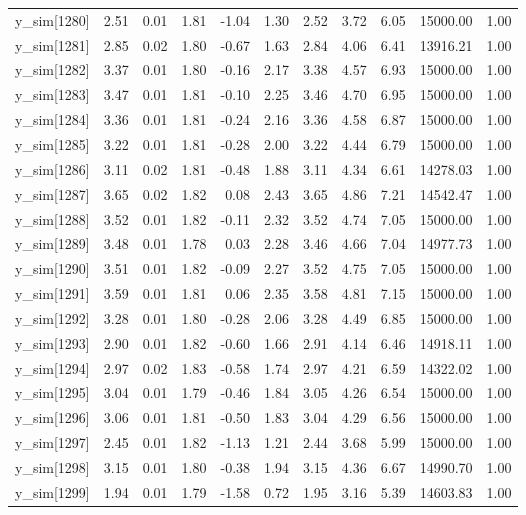 \begin{table}[ht]
\begin{tabular}{rrrrrrrrrrr}
  y\_sim[1280] & 2.51 & 0.01 & 1.81 & -1.04 & 1.30 & 2.52 & 3.72 & 6.05 & 15000.00 & 1.00 \\ 
  y\_sim[1281] & 2.85 & 0.02 & 1.80 & -0.67 & 1.63 & 2.84 & 4.06 & 6.41 & 13916.21 & 1.00 \\ 
  y\_sim[1282] & 3.37 & 0.01 & 1.80 & -0.16 & 2.17 & 3.38 & 4.57 & 6.93 & 15000.00 & 1.00 \\ 
  y\_sim[1283] & 3.47 & 0.01 & 1.81 & -0.10 & 2.25 & 3.46 & 4.70 & 6.95 & 15000.00 & 1.00 \\ 
  y\_sim[1284] & 3.36 & 0.01 & 1.81 & -0.24 & 2.16 & 3.36 & 4.58 & 6.87 & 15000.00 & 1.00 \\ 
  y\_sim[1285] & 3.22 & 0.01 & 1.81 & -0.28 & 2.00 & 3.22 & 4.44 & 6.79 & 15000.00 & 1.00 \\ 
  y\_sim[1286] & 3.11 & 0.02 & 1.81 & -0.48 & 1.88 & 3.11 & 4.34 & 6.61 & 14278.03 & 1.00 \\ 
  y\_sim[1287] & 3.65 & 0.02 & 1.82 & 0.08 & 2.43 & 3.65 & 4.86 & 7.21 & 14542.47 & 1.00 \\ 
  y\_sim[1288] & 3.52 & 0.01 & 1.82 & -0.11 & 2.32 & 3.52 & 4.74 & 7.05 & 15000.00 & 1.00 \\ 
  y\_sim[1289] & 3.48 & 0.01 & 1.78 & 0.03 & 2.28 & 3.46 & 4.66 & 7.04 & 14977.73 & 1.00 \\ 
  y\_sim[1290] & 3.51 & 0.01 & 1.82 & -0.09 & 2.27 & 3.52 & 4.75 & 7.05 & 15000.00 & 1.00 \\ 
  y\_sim[1291] & 3.59 & 0.01 & 1.81 & 0.06 & 2.35 & 3.58 & 4.81 & 7.15 & 15000.00 & 1.00 \\ 
  y\_sim[1292] & 3.28 & 0.01 & 1.80 & -0.28 & 2.06 & 3.28 & 4.49 & 6.85 & 15000.00 & 1.00 \\ 
  y\_sim[1293] & 2.90 & 0.01 & 1.82 & -0.60 & 1.66 & 2.91 & 4.14 & 6.46 & 14918.11 & 1.00 \\ 
  y\_sim[1294] & 2.97 & 0.02 & 1.83 & -0.58 & 1.74 & 2.97 & 4.21 & 6.59 & 14322.02 & 1.00 \\ 
  y\_sim[1295] & 3.04 & 0.01 & 1.79 & -0.46 & 1.84 & 3.05 & 4.26 & 6.54 & 15000.00 & 1.00 \\ 
  y\_sim[1296] & 3.06 & 0.01 & 1.81 & -0.50 & 1.83 & 3.04 & 4.29 & 6.56 & 15000.00 & 1.00 \\ 
  y\_sim[1297] & 2.45 & 0.01 & 1.82 & -1.13 & 1.21 & 2.44 & 3.68 & 5.99 & 15000.00 & 1.00 \\ 
  y\_sim[1298] & 3.15 & 0.01 & 1.80 & -0.38 & 1.94 & 3.15 & 4.36 & 6.67 & 14990.70 & 1.00 \\ 
  y\_sim[1299] & 1.94 & 0.01 & 1.79 & -1.58 & 0.72 & 1.95 & 3.16 & 5.39 & 14603.83 & 1.00 \\ 

\end{tabular}
\end{table}
